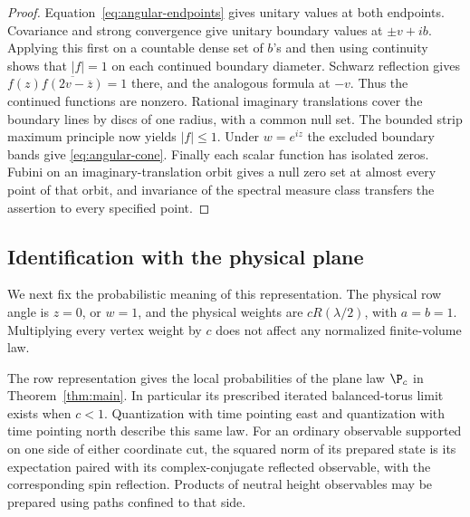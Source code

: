 \begin{proof}
Equation~\eqref{eq:angular-endpoints} gives unitary values at both
endpoints.  Covariance and strong convergence give unitary boundary
values at $\pm v+ib$.  Applying this first on a countable dense set of
$b$'s and then using continuity shows that $|f|=1$ on each continued
boundary diameter.  Schwarz reflection gives
$f(z)\overline{f(2v-\overline z)}=1$ there, and the analogous formula
at $-v$.  Thus the continued functions are nonzero.  Rational imaginary
translations cover the boundary lines by discs of one radius, with a
common null set.  The bounded strip maximum principle now yields
$|f|\le1$.  Under $w=e^{iz}$ the excluded boundary bands give
\eqref{eq:angular-cone}.  Finally each scalar function has isolated
zeros.  Fubini on an imaginary-translation orbit gives a null zero set
at almost every point of that orbit, and invariance of the spectral
measure class transfers the assertion to every specified point.
\end{proof}

\subsection{Identification with the physical plane}

We next fix the probabilistic meaning of this representation.  The
physical row angle is $z=0$, or $w=1$, and the physical weights are
$cR(\lambda/2)$, with $a=b=1$.  Multiplying every vertex weight by $c$
does not affect any normalized finite-volume law.

\begin{proposition}
\label{prop:physical-plane}
The row representation gives the local probabilities of the plane law
$\P_c$ in Theorem~\ref{thm:main}.  In particular its prescribed iterated
balanced-torus limit exists when $c<1$.  Quantization with time pointing
east and quantization with time pointing north describe this same law.
For an ordinary observable supported on one side of either coordinate
cut, the squared norm of its prepared state is its expectation paired
with its complex-conjugate reflected observable, with the corresponding
spin reflection.  Products of neutral height observables may be prepared
using paths confined to that side.
\end{proposition}

